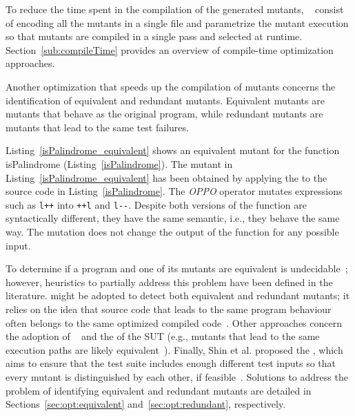 To reduce the time spent in the compilation of the generated mutants, ~\cite{untch1993mutation} consist of encoding all the mutants in a single file and parametrize the mutant execution so that mutants are compiled in a single pass and selected at runtime. Section~\ref{sub:compileTime} provides an overview of compile-time optimization approaches.

Another optimization that speeds up the compilation of mutants concerns the identification of equivalent and redundant mutants. Equivalent mutants are mutants that behave as the original program, while redundant mutants are mutants that lead to the same test failures. 




Listing~\ref{isPalindrome_equivalent} shows an equivalent mutant for the function isPalindrome (Listing~\ref{isPalindrome}). The mutant in Listing~\ref{isPalindrome_equivalent} has been obtained by applying the  to the source code in Listing~\ref{isPalindrome}. The \textit{OPPO} operator mutates expressions such as \texttt{l++} into \texttt{++l} and \texttt{l-}\texttt{-}.
Despite both versions of the function are syntactically different, they have the same semantic, i.e., they behave the same way. The mutation does not change the output of the function for any possible input.

To determine if a program and one of its mutants are
equivalent is undecidable~\cite{Budd:1982}; however, heuristics to partially address this problem have been defined in the literature.
 might be adopted to detect both equivalent and redundant mutants; it relies on the idea that source code that leads to the same program behaviour often belongs to the same optimized compiled code~\cite{papadakis2015trivial}. Other approaches concern the adoption of ~\cite{papadakis2012mutation,kurtz2015static} and the  of the SUT (e.g., mutants that lead to the same execution paths are likely equivalent~\cite{schuler2013covering}). Finally, Shin et al. proposed the , which aims to ensure that the test suite includes enough different test inputs so that every mutant is distinguished by each other, if feasible~\cite{shin2017theoretical}. 
Solutions to address the problem of identifying equivalent and redundant mutants are detailed in Sections~\ref{sec:opt:equivalent} and~\ref{sec:opt:redundant}, respectively.


